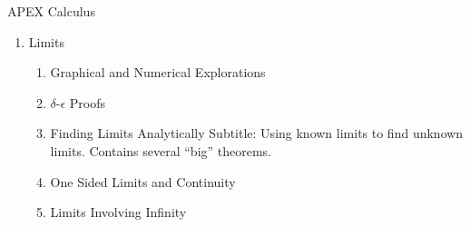 \documentclass[10pt]{article}
\begin{document}
APEX Calculus

\begin{enumerate}
	\item	Limits
		\begin{enumerate}
		\item		Graphical and Numerical Explorations %
		
%		
%		
%		
		
		\item		$\delta$-$\epsilon$ Proofs	%
		
		
		\item		Finding Limits Analytically	Subtitle: Using known limits to find unknown limits. Contains several ``big'' theorems.
		
%		
%		
%		
%		
%		
%		
		
		\item		One Sided Limits and Continuity
		
%		
%		
%		
		
		\item		Limits Involving Infinity
		

\end{enumerate}
\end{enumerate}
\end{document}
